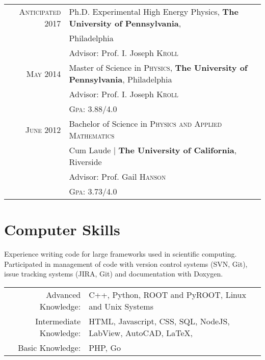 \documentclass[a4paper,10pt]{article} %
\begin{document}
\begin{tabular}{rl}
\textsc{Anticipated 2017} & Ph.D. Experimental High Energy Physics, \textbf{The University of Pennsylvania}, \\
                          & Philadelphia \\
&\small Advisor: Prof. I. Joseph \textsc{Kroll}\\
\vspace{1mm}


\textsc{May} 2014 & Master of Science in \textsc{Physics}, \textbf{The University of Pennsylvania}, Philadelphia\\
&\small Advisor: Prof. I. Joseph \textsc{Kroll}\\
&\normalsize \textsc{Gpa}: 3.88/4.0\\
\vspace{1mm}


\textsc{June} 2012& Bachelor of Science in \textsc{}\textsc{Physics and Applied Mathematics} \\
&Cum Laude | \normalsize\textbf{The University of California}, Riverside\\
&\small Advisor: Prof. Gail \textsc{Hanson}\\
&\normalsize \textsc{Gpa}: 3.73/4.0 \\

\end{tabular}
\vspace{0mm}


\section{Computer Skills}

Experience writing code for large frameworks used in scientific computing. Participated
in management of code with version control systems (SVN, Git), issue tracking systems (JIRA, Git)
and documentation with Doxygen.

\begin{tabular}{rl}

Advanced Knowledge: & C++, Python, ROOT and PyROOT, Linux and Unix Systems \\
Intermediate Knowledge: & HTML, Javascript, CSS, SQL, NodeJS, LabView, AutoCAD, \LaTeX, \\
Basic Knowledge:        & PHP, Go
\end{tabular}
\vspace{1mm}
\end{document}
